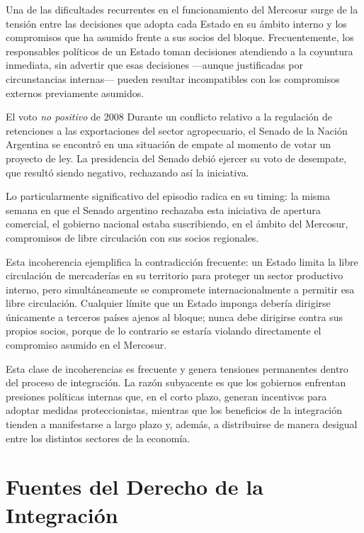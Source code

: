 \documentclass[12pt,oneside]{book}
\begin{document}
Una de las dificultades recurrentes en el funcionamiento del Mercosur surge de la tensión entre las decisiones que adopta cada Estado en su ámbito interno y los compromisos que ha asumido frente a sus socios del bloque. Frecuentemente, los responsables políticos de un Estado toman decisiones atendiendo a la coyuntura inmediata, sin advertir que esas decisiones —aunque justificadas por circunstancias internas— pueden resultar incompatibles con los compromisos externos previamente asumidos.

\begin{example}{El voto \textit{no positivo} de 2008}
Durante un conflicto relativo a la regulación de retenciones a las exportaciones del sector agropecuario, el Senado de la Nación Argentina se encontró en una situación de empate al momento de votar un proyecto de ley. La presidencia del Senado debió ejercer su voto de desempate, que resultó siendo negativo, rechazando así la iniciativa.

Lo particularmente significativo del episodio radica en su timing: la misma semana en que el Senado argentino rechazaba esta iniciativa de apertura comercial, el gobierno nacional estaba suscribiendo, en el ámbito del Mercosur, compromisos de libre circulación con sus socios regionales.

Esta incoherencia ejemplifica la contradicción frecuente: un Estado limita la libre circulación de mercaderías en su territorio para proteger un sector productivo interno, pero simultáneamente se compromete internacionalmente a permitir esa libre circulación. Cualquier límite que un Estado imponga debería dirigirse únicamente a terceros países ajenos al bloque; nunca debe dirigirse contra sus propios socios, porque de lo contrario se estaría violando directamente el compromiso asumido en el Mercosur.
\end{example}

Esta clase de incoherencias es frecuente y genera tensiones permanentes dentro del proceso de integración. La razón subyacente es que los gobiernos enfrentan presiones políticas internas que, en el corto plazo, generan incentivos para adoptar medidas proteccionistas, mientras que los beneficios de la integración tienden a manifestarse a largo plazo y, además, a distribuirse de manera desigual entre los distintos sectores de la economía.

\chapter{Fuentes del Derecho de la Integración}
\end{document}
